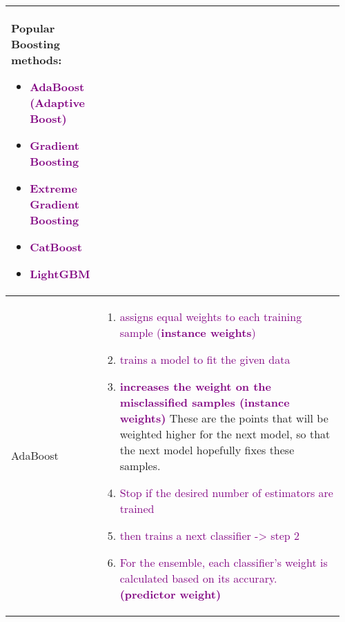 \documentclass[main.tex,fontsize=8pt,paper=a4,paper=portrait,DIV=calc,]{scrartcl}
\begin{document}
\begin{table}[ht!]
\begin{tabular}{|m{0.2\linewidth}|m{0.755\linewidth}|}
Popular Boosting methods: \newline
\begin{itemize}
  \item \textcolor{purple}{\textbf{AdaBoost (Adaptive Boost)}}
\item \textcolor{purple}{Gradient Boosting}
\item \textcolor{purple}{Extreme Gradient Boosting}
\item \textcolor{purple}{CatBoost} 
\item \textcolor{purple}{LightGBM}
\vspace{-3mm}
\end{itemize} 
\\
\hline
AdaBoost &
\vspace{2mm}
\begin{enumerate}
\item \textcolor{purple}{assigns equal weights to each training sample (\textbf{instance weights})}
\item \textcolor{purple}{trains a model to fit the given data}
\item \textcolor{purple}{\textbf{increases the weight on the misclassified samples (instance weights)}}\newline
  These are the points that will be weighted higher for the next model, so that the next model hopefully fixes these samples.\newline
\item \textcolor{purple}{Stop if the desired number of estimators are trained}
\item \textcolor{purple}{then trains a next classifier -> step 2}
\item \textcolor{purple}{For the ensemble, each classifier's weight is calculated based on its accurary. \textbf{(predictor weight)}}\newline
  \vspace{-3mm}
\end{enumerate} 
\\
\hline
\end{tabular}
\end{table}
\pagebreak
\end{document}
